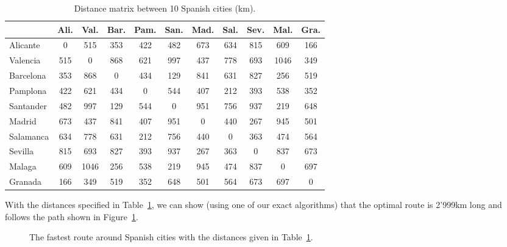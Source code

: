 \begin{table}[hbt]
\begin{center}
\begin{tabular}{|l|cccccccccc|}
\cline{2-11}
\multicolumn{1}{c|}{} & Ali.   & Val.  & Bar. & Pam. & San. & Mad. & Sal. & Sev. & Mal.  & Gra. \\
\hline 
Alicante	& 0   & 515  & 353 & 422 & 482 & 673 & 634 & 815 & 609  & 166 \\
Valencia    & 515 & 0    & 868 & 621 & 997 & 437 & 778 & 693 & 1046 & 349 \\
Barcelona	& 353 & 868  & 0   & 434 & 129 & 841 & 631 & 827 & 256  & 519 \\
Pamplona	& 422 & 621  & 434 & 0   & 544 & 407 & 212 & 393 & 538  & 352 \\
Santander	& 482 & 997  & 129 & 544 & 0   & 951 & 756 & 937 & 219  & 648 \\
Madrid		& 673 & 437  & 841 & 407 & 951 & 0   & 440 & 267 & 945  & 501 \\
Salamanca	& 634 & 778  & 631 & 212 & 756 & 440 & 0   & 363 & 474  & 564 \\
Sevilla		& 815 & 693  & 827 & 393 & 937 & 267 & 363 & 0   & 837  & 673 \\
Malaga		& 609 & 1046 & 256 & 538 & 219 & 945 & 474 & 837 & 0    & 697 \\
Granada		& 166 & 349  & 519 & 352 & 648 & 501 & 564 & 673 & 697  & 0   \\
\hline 
\end{tabular}
\caption{Distance matrix between 10 Spanish cities (km).}
\label{tab:distance_matrix}
\end{center}
\end{table}	

With the distances specified in Table~\ref{tab:distance_matrix}, we can show (using one of our exact algorithms) that the optimal route is 2'999\:km long and follows the path shown in Figure~\ref{fig:fastest_route_around_spannish_cities}. 

\begin{figure}[htb]
\begin{center}
\caption{The fastest route around Spanish cities with the distances given in Table~\ref{tab:distance_matrix}.}
\label{fig:fastest_route_around_spannish_cities}
\end{center}
\end{figure}
\clearpage
